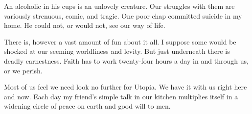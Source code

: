 \begin{biblechapter}
\verse An alcoholic in his cups is an unlovely creature.  
\verse Our struggles with them are variously strenuous, comic, and tragic.  
\verse One poor chap committed suicide in my home.  
\verse He could not, or would not, see our way of life.

\verse There is, however a vast amount of fun about it all.  
\verse I suppose some would be shocked at our seeming worldliness and levity.  
\verse But just underneath there is deadly earnestness.  
\verse Faith has to work twenty-four hours a day in and through us, or we perish.

\verse Most of us feel we need look no further for Utopia.  
\verse We have it with us right here and now.  
\verse Each day my friend's simple talk in our kitchen multiplies itself 
    in a widening circle of peace on earth and good will to men.
\end{biblechapter}

